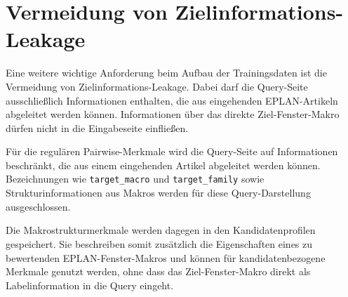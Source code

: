 \section{Vermeidung von Zielinformations-Leakage}

Eine weitere wichtige Anforderung beim Aufbau der Trainingsdaten ist die Vermeidung von Zielinformations-Leakage. Dabei darf die Query-Seite ausschließlich Informationen enthalten, die aus eingehenden EPLAN-Artikeln \cite{EPLANArtikelverwaltung} abgeleitet werden können. Informationen über das direkte Ziel-Fenster-Makro \cite{EPLAN-Makros} dürfen nicht in die Eingabeseite einfließen.

Für die regulären Pairwise-Merkmale wird die Query-Seite auf Informationen beschränkt, die aus einem eingehenden Artikel abgeleitet werden können. Bezeichnungen wie \texttt{target\_macro} und \texttt{target\_family} sowie Strukturinformationen aus Makros werden für diese Query-Darstellung ausgeschlossen.

Die Makrostrukturmerkmale werden dagegen in den Kandidatenprofilen gespeichert. Sie beschreiben somit zusätzlich die Eigenschaften eines zu bewertenden EPLAN-Fenster-Makros \cite{EPLAN-Makros} und können für kandidatenbezogene Merkmale genutzt werden, ohne dass das Ziel-Fenster-Makro \cite{EPLAN-Makros} direkt als Labelinformation in die Query eingeht.